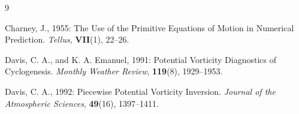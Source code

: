 \documentclass[11pt,a4paper]{article}
\begin{document}
\begin{thebibliography}{9}

Charney, J., 1955:
The Use of the Primitive Equations of Motion in Numerical Prediction.
\emph{Tellus}, \textbf{VII}(1), 22--26.

Davis, C. A., and K. A. Emanuel, 1991:
Potential Vorticity Diagnostics of Cyclogenesis.
\emph{Monthly Weather Review}, \textbf{119}(8), 1929--1953.

Davis, C. A., 1992:
Piecewise Potential Vorticity Inversion.
\emph{Journal of the Atmospheric Sciences}, \textbf{49}(16), 1397--1411.

\end{thebibliography}
\end{document}
